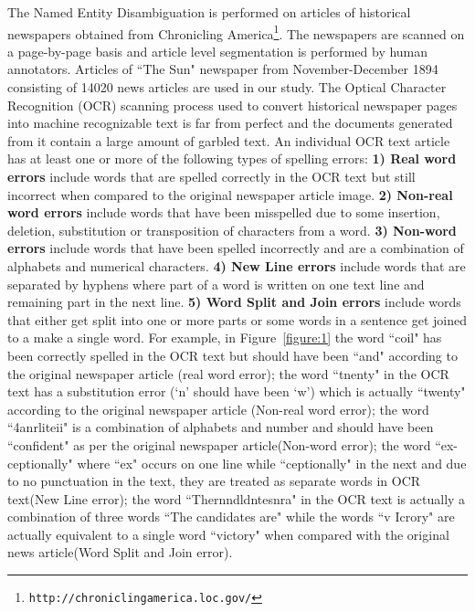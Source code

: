 

The Named Entity Disambiguation is performed on articles of historical newspapers obtained from Chronicling America\footnote{\texttt{http://chroniclingamerica.loc.gov/}}. The newspapers are scanned on a page-by-page basis and article level
segmentation is performed by human annotators. Articles of ``The Sun" newspaper from November-December 1894 consisting of 14020 news articles are used in our study. 
The Optical Character Recognition (OCR) scanning process used to convert historical newspaper pages into machine recognizable text is far
from perfect and the documents generated from it contain a large
amount of garbled text.
An individual OCR text article has at least one or more of the following types of spelling errors:
 \textbf{1) Real word errors} include words that are spelled correctly in the OCR text but still incorrect when compared to the original newspaper article image.  \textbf{2) Non-real word errors} include words that have been misspelled due to some insertion, deletion, substitution or transposition of characters from a word.  \textbf{3) Non-word errors} include words that have been spelled incorrectly and are a combination of alphabets and numerical characters. \textbf{4) New Line errors} include words that are separated by hyphens where part of a word is written on one text line and remaining part in the next line. 
\textbf{5) Word Split and Join errors} include words that either get split into one or more parts or some words in a sentence get joined to a make a single word. 
For example, in Figure~\ref{figure:1} the word ``coil"  has been correctly spelled in the OCR text but should have been ``and" according to the original newspaper article (real word error); the word ``tnenty" in the OCR text has a substitution error (`n' should have been `w') which is actually ``twenty" according to the original newspaper article (Non-real word error); the word ``4anrliteii" is a combination of alphabets and number and should have been ``confident" as per the original newspaper article(Non-word error); the word ``ex-ceptionally" where ``ex" occurs on one line while ``ceptionally" in the next and due to no punctuation in the text, they are treated as separate words in OCR text(New Line error); the word ``Thernndldntesnra" in the OCR text is actually a combination of three words ``The candidates are" while the words ``v Icrory" are actually equivalent to a single word ``victory" when compared with the original news article(Word Split and Join error).

